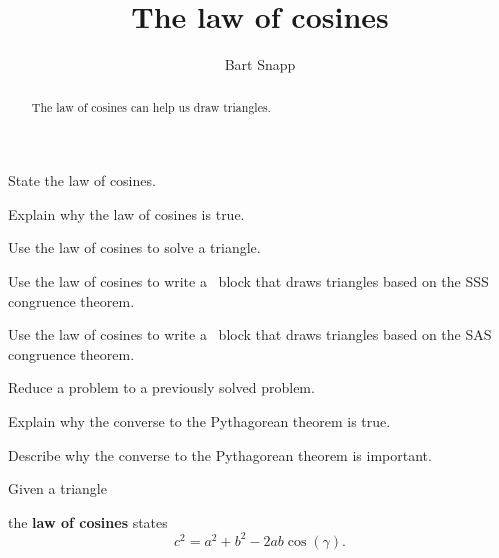 \documentclass[noauthor,nooutcomes,handout,hints]{ximera}
\title{The law of cosines}
\author{Bart Snapp}
\begin{document}
\begin{abstract}
   The law of cosines can help us draw triangles.
\end{abstract}
\maketitle

\begin{listOutcomes}
\item State the law of cosines.
\item Explain why the law of cosines is true.
\item Use the law of cosines to solve a triangle.
\item Use the law of cosines to write a \snap\ block that draws triangles
  based on the SSS congruence theorem.
\item Use the law of cosines to write a \snap\ block that draws triangles
  based on the SAS congruence theorem.
\item Reduce a problem to a previously solved problem.
\item Explain why the converse to the Pythagorean theorem is true.
\item Describe why the converse to the Pythagorean theorem is
  important.
\end{listOutcomes}

Given a triangle
\begin{center}
\end{center}
the \textbf{law of cosines} states
\[
c^2 = a^2 + b^2 - 2ab\cos(\gamma).
\]
\mynewpage
\end{document}
